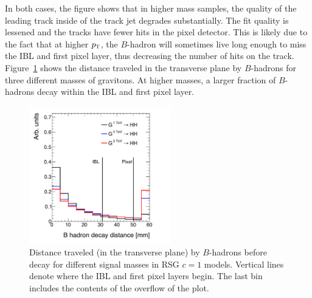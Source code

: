 %
In both cases, the figure shows that in higher mass samples, the quality of the leading track inside of the track jet degrades substantially. The fit quality is lessened and the tracks have fewer hits in the pixel detector. This is likely due to the fact that at higher $p_{\textrm{\footnotesize\sc t}}$, the $B$-hadron will sometimes live long enough to miss the IBL and first pixel layer, thus decreasing the number of hits on the track. Figure~\ref{fig:b_decay_dist} shows the distance traveled in the transverse plane by $B$-hadrons for three different masses of gravitons. At higher masses, a larger fraction of $B$-hadrons decay within the IBL and first pixel layer. 

\begin{figure}[h!]
  \centering
  \captionsetup{justification=centering}

  \includegraphics[width=0.55\textwidth]{figures/B_decay_dist}
  \caption{Distance traveled (in the transverse plane) by $B$-hadrons before decay for different signal masses in RSG $c=1$ models. Vertical lines denote where the IBL and first pixel layers begin. The last bin includes the contents of the overflow of the plot.}
  \label{fig:b_decay_dist}
\end{figure}


